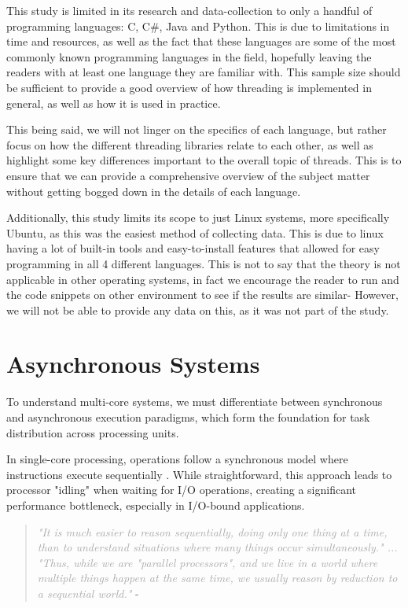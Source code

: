 \documentclass[12pt,a4paper]{article}
\begin{document}
This study is limited in its research and data-collection to only a handful of programming languages: C, C\#, Java and Python. This is due to limitations in time and resources, as well as the fact that these languages are some of the most commonly known programming languages in the field, hopefully leaving the readers with at least one language they are familiar with. This sample size should be sufficient to provide a good overview of how threading is implemented in general, as well as how it is used in practice. 

This being said, we will not linger on the specifics of each language, but rather focus on how the different threading libraries relate to each other, as well as highlight some key differences important to the overall topic of threads. This is to ensure that we can provide a comprehensive overview of the subject matter without getting bogged down in the details of each language.

Additionally, this study limits its scope to just Linux systems, more specifically Ubuntu, as this was the easiest method of collecting data. This is due to linux having a lot of built-in tools and easy-to-install features that allowed for easy programming in all 4 different languages. This is not to say that the theory is not applicable in other operating systems, in fact we encourage the reader to run and the code snippets on other environment to see if the results are similar- However, we will not be able to provide any data on this, as it was not part of the study.

\section{Asynchronous Systems}

To understand multi-core systems, we must differentiate between synchronous and asynchronous execution paradigms, which form the foundation for task distribution across processing units.

In single-core processing, operations follow a synchronous model where instructions execute sequentially \parencite[p. 118]{Johnson2015}. While straightforward, this approach leads to processor "idling"\parencite[p. 5]{Rauber2023} when waiting for I/O operations, creating a significant performance bottleneck, especially in I/O-bound applications.

\begin{quote}
    \textit{\textcolor{darkgray}{"It is much easier to reason sequentially, doing only one thing at a time, than to understand situations where many things occur simultaneously." ... "Thus, while we are "parallel processors", and we live in a world where multiple things happen at the same time, we usually reason by reduction to a sequential world."}} - \cite{Rajsbaum2020}
\end{quote}
\end{document}

